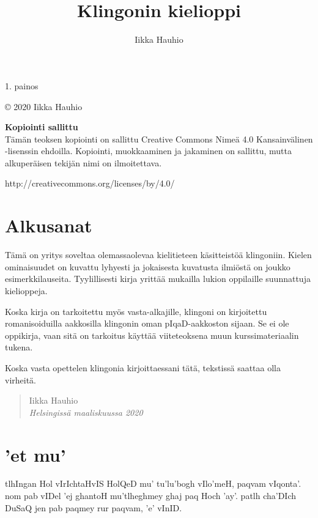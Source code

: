 \documentclass{book}
\title{{\pIqaD   }\\Klingonin kielioppi}
\author{Iikka Hauhio}
\begin{document}
\frontmatter

\maketitle

\newpage
\vspace*{\fill}
1. painos

© 2020 Iikka Hauhio


\textbf{Kopiointi sallittu} \\
Tämän teoksen kopiointi on sallittu Creative Commons Nimeä 4.0 Kansainvälinen -lisenssin ehdoilla.
Kopiointi, muokkaaminen ja jakaminen on sallittu, mutta alkuperäisen tekijän nimi on ilmoitettava.

http://creativecommons.org/licenses/by/4.0/

\chapter{Alkusanat}

Tämä on yritys soveltaa olemassaolevaa kielitieteen käsitteistöä klingoniin.
Kielen ominaisuudet on kuvattu lyhyesti ja jokaisesta kuvatusta ilmiöstä on joukko esimerkkilauseita.
Tyylillisesti kirja yrittää mukailla lukion oppilaille suunnattuja kielioppeja.

Koska kirja on tarkoitettu myös vasta-alkajille, klingoni on kirjoitettu romanisoiduilla aakkosilla klingonin oman pIqaD-aakkoston sijaan.
Se ei ole oppikirja, vaan sitä on tarkoitus käyttää viiteteoksena muun kurssimateriaalin tukena.

Koska vasta opettelen klingonia kirjoittaessani tätä, tekstissä saattaa olla virheitä.

\begin{quote}
    Iikka Hauhio \\
    \textit{Helsingissä maaliskuussa 2020}
\end{quote}

\chapter{'et mu'}

tlhIngan Hol vIrIchtaHvIS HolQeD mu' tu'lu'bogh vIlo'meH, paqvam vIqonta'.
nom pab vIDel 'ej ghantoH mu'tlheghmey ghaj paq Hoch 'ay'.
patlh cha'DIch DuSaQ jen pab paqmey rur paqvam, 'e' vInID.
\end{document}
